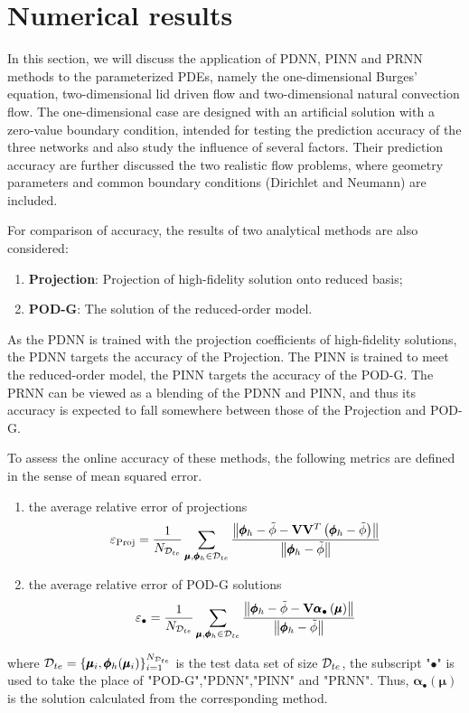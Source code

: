 \documentclass[preprint, 10pt]{elsarticle}
\begin{document}
\section{Numerical results}
In this section,
we will discuss the application of PDNN, PINN and PRNN methods to the parameterized PDEs, namely the one-dimensional Burges' equation, two-dimensional lid driven flow and two-dimensional natural convection flow.
The one-dimensional case are designed with an artificial solution with a zero-value boundary condition, intended for testing the prediction accuracy of the three networks and also study the influence of several factors. Their prediction accuracy are further discussed the two realistic flow problems, where geometry parameters and common boundary conditions (Dirichlet and Neumann) are included.

For comparison of accuracy, the results of two analytical methods are also considered:
\begin{enumerate}[(1)]
\item \textbf{Projection}: Projection of high-fidelity solution onto reduced basis;
\item \textbf{POD-G}: The solution of the reduced-order model.
\end{enumerate}
As the PDNN is trained with the projection coefficients of high-fidelity solutions, the PDNN targets the accuracy of the Projection. The PINN is trained to meet the reduced-order model, the PINN targets the accuracy of the POD-G. The PRNN can be viewed as a blending of the PDNN and PINN, and thus its accuracy is expected to fall somewhere between those of the Projection and POD-G.

To assess the online accuracy of these methods, the following metrics are defined in the sense of mean squared error.
\begin{enumerate}[(1)]
\item the average relative error of  projections
\begin{equation}
\varepsilon_{\rm{Proj}}
=\frac{1}{N_{{\cal D}_{te}}}
\sum\limits_{\pmb\mu ,\pmb{\phi}_h  \in {{\cal D}_{te}}}{
\frac{\left\| \pmb{\phi}_h - \tilde{\phi} -\mathbf{V}\mathbf{V}^T \left( \pmb{\phi}_h - \tilde{\phi} \right)  \right\|}
{\left\| \pmb{\phi}_h  - \tilde{\phi} \right\|}
}
\end{equation}

\item the average relative error of POD-G solutions
\begin{equation}
\varepsilon_{\bullet}
=\frac{1}{N_{{\cal D}_{te}}}
\sum\limits_{\pmb\mu ,\pmb{\phi}_h  \in {{\cal D}_{te}}}{
\frac{\left\| \pmb{\phi}_h- \tilde{\phi}-\mathbf{V}\pmb{\alpha}_{\bullet}\left( \pmb{\mu}\right)
\right\|}
{\left\| \pmb{\phi}_h - \tilde{\phi} \right\|}
}
\end{equation}

\end{enumerate}
where ${{\cal D}_{te}}=\{\pmb{\mu}_i, \pmb{\phi}_h(\pmb{\mu}_i)\}_{i=1}^{N_{{\cal D}_{te}}}$ is the test data set of size ${{\cal D}_{te}}$, the subscript "$\bullet$" is used to take the place of "POD-G","PDNN","PINN" and "PRNN". Thus, $\pmb{\alpha}_{\bullet}\left( \pmb{\mu}\right)$ is the solution calculated from the corresponding method.
\end{document}
